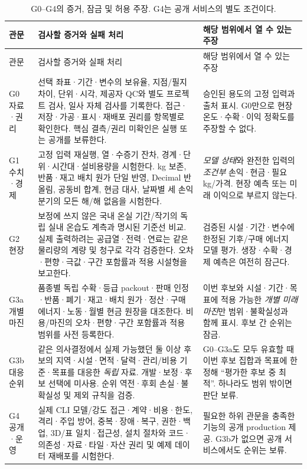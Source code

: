 \documentclass[11pt,a4paper]{article}
\newcommand{\hold}{\textsf{판단 보류}}
\begin{document}
\begin{longtable}{p{1.3cm}p{7.05cm}p{5.0cm}}
\caption{G0--G4의 증거, 잠금 및 허용 주장. G4는 공개 서비스의 별도 조건이다.}\label{tab:gates}\\
\toprule
관문 & 검사할 증거와 실패 처리 & 해당 범위에서 열 수 있는 주장 \\
\midrule
\endfirsthead
\toprule
관문 & 검사할 증거와 실패 처리 & 해당 범위에서 열 수 있는 주장 \\
\midrule
\endhead
G0 자료·권리 & 선택 좌표·기간·변수의 보유율, 지점/필지 차이, 단위·시각, 제공자 QC와 별도 프로젝트 검사, 일사 자체 검사를 기록한다. 접근·저장·가공·표시·재배포 권리를 항목별로 확인한다. 핵심 결측/권리 미확인은 실행 또는 공개를 보류한다. & 승인된 용도의 고정 입력과 출처 표시. G0만으로 현장 온도·수확·이익 정확도를 주장할 수 없다. \\
G1 수치·경제 & 고정 입력 재실행, 열·수증기 잔차, 경계·단위·시간대·설비용량을 시험한다. kg 보존, 반품·재고 배치 원가 단일 반영, Decimal 반올림, 공동비 합계, 현금 대사, 날짜별 세 손익분기의 모든 해/해 없음을 시험한다. & \emph{모델 상태}와 완전한 입력의 \emph{조건부} 손익·현금·필요 kg/가격. 현장 예측 또는 미래 이익으로 부르지 않는다. \\
G2 현장 & 보정에 쓰지 않은 국내 온실 기간/작기의 독립 실내 온습도 계측과 명시된 기준선 비교. 실제 출력하려는 공급열·전력·연료는 같은 물리량의 계량 및 청구로 각각 검증한다. 오차·편향·극값·구간 포함률과 적용 시설형을 보고한다. & 검증된 시설·기간·변수에 한정된 기후/구매 에너지 모델 평가. 생장·수확·경제 예측은 여전히 잠근다. \\
G3a 개별 마진 & 품종별 독립 수확·등급 packout·판매 인정·반품·폐기·재고·배치 원가·정산·구매 에너지·노동·월별 현금 원장을 대조한다. 비용/마진의 오차·편향·구간 포함률과 적용 범위를 사전 등록한다. & 이번 후보와 시설·기간·목표에 적용 가능한 \emph{개별 미래 마진}만 범위·불확실성과 함께 표시. 후보 간 순위는 잠금. \\
G3b 대응 순위 & 같은 의사결정에서 실제 가능했던 둘 이상 후보의 지역·시설·면적·달력·관리/비용 기준·목표를 대응한 \emph{독립} 자료. 개발·보정·후보 선택에 미사용. 순위 역전·후회 손실·불확실성 및 제외 규칙을 검증. & G0--G3a도 모두 유효할 때 이번 후보 집합과 목표에 한정해 ``평가한 후보 중 최적''. 하나라도 범위 밖이면 \hold. \\
G4 공개·운영 & 실제 CLI 모델/강도 접근·계약·비용·한도, 격리·주입 방어, 중복·장애·복구, 권한·백업, 3D/표 일치·접근성, 설치 절차와 코드·의존성·자료·타일·자산 권리 및 예제 데이터 재배포를 시험한다. & 필요한 하위 관문을 충족한 기능의 공개 production 제공. G3b가 없으면 공개 서비스에서도 순위는 보류. \\
\bottomrule
\end{longtable}
\end{document}
